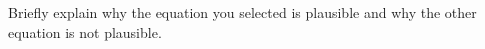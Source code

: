 \documentclass{../../../oss-apphys}
\begin{document}
\begin{enumerate}[leftmargin=15pt]
\begin{enumerate}[leftmargin=15pt]
     \vspace{.1in}Briefly explain why the equation you selected is plausible
     and why the other equation is not plausible.
  \end{enumerate}
%  
%

\end{enumerate}
\end{document}
